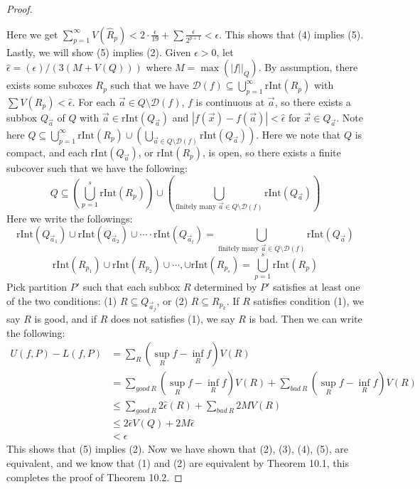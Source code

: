 \documentclass[15pt]{book}
\theoremstyle{break}
\theoremstyle{break}
\newcommand{\D}{\mathcal{D}}
\begin{document}
\begin{proof}
\begin{enumerate}[topsep=3pt,itemsep=-1ex,partopsep=1ex,parsep=1ex]
\end{enumerate}
Here we get $\sum_{p=1}^\infty V(\hat{R}_p) < 2\cdot \frac{\epsilon}{19} + \sum \frac{\epsilon}{2^{p+1}} < \epsilon$. This shows that (4) implies (5). Lastly, we will show (5) implies (2). Given $\epsilon>0$, let $\hat{\epsilon} =(\epsilon)/(3(M+V(Q)))$ where $M = \max(|f||_Q)$. By assumption, there exists some suboxes $R_p$ such that we have $\D(f) \subseteq \bigcup_{p=1}^\infty \text{rInt}(R_p)$ with $\sum V(R_p)<\hat{\epsilon}$. For each $\vec{a}\in Q \setminus \D(f)$, $f$ is continuous at $\vec{a}$, so there exists a subbox $Q_{\vec{a}}$ of $Q$ with $\vec{a}\in \text{rInt}(Q_{\vec{a}})$ and $|f(\vec{x}) - f(\vec{a})| < \hat{\epsilon}$ for $\vec{x}\in Q_{\vec{a}}$. Note here $Q \subseteq \bigcup_{p=1}^\infty \text{rInt}(R_p) \cup (\bigcup_{\vec{a}\in Q\setminus \D(f)} \text{rInt}(Q_{\vec{a}}))$. Here we note that $Q$ is compact, and each $\text{rInt}(Q_{\vec{a}})$, or $\text{rInt}(R_p)$, is open, so there exists a finite subcover such that we have the following:
$$Q \subseteq \left(\bigcup_{p=1}^s \text{rInt}(R_{p})\right) \cup \left( \bigcup_{\text{finitely many }\vec{a}\in Q\setminus \D(f)} \text{rInt}(Q_{\vec{a}}) \right)$$
Here we write the followings:
$$\text{rInt}(Q_{\vec{a}_1}) \cup \text{rInt}(Q_{\vec{a}_2}) \cup \cdots \cdot \text{rInt}(Q_{\vec{a}_t}) = \bigcup_{\text{finitely many }\vec{a}\in Q\setminus \D(f)} \text{rInt}(Q_{\vec{a}}) $$
$$\text{rInt}(R_{p_1})\cup \text{rInt}(R_{p_2})\cup \cdots, \cup \text{rInt}(R_{p_s}) = \bigcup_{p=1}^s \text{rInt}(R_{p})$$ 
Pick partition $P'$ such that each subbox $R$ determined by $P'$ satisfies at least one of the two conditions:
(1) $R \subseteq Q_{\vec{a}_j}$, or
(2) $R \subseteq R_{p_k}$.
If $R$ satisfies condition (1), we say $R$ is good, and if $R$ does not satisfies (1), we say $R$ is bad. Then we can write the following:
\begin{align*}
U(f,P) - L(f,P) &= \sum_{R} (\sup_{R} f - \inf_R f) V(R)\\
&= \sum_{good\ R}(\sup_{R} f - \inf_R f) V(R) + \sum_{bad\ R} (\sup_{R} f - \inf_R f) V(R)\\ &\leq \sum_{good\ R} 2\hat{ \epsilon}(R)  + \sum_{bad \ R}2MV(R)\\ &\leq 2\hat{\epsilon}V(Q) + 2M\hat{\epsilon} \\&< \epsilon
\end{align*}
This shows that (5) implies (2). Now we have shown that (2), (3), (4), (5), are equivalent, and we know that (1) and (2) are equivalent by Theorem 10.1, this completes the proof of Theorem 10.2. 
\end{proof}
\end{document}
